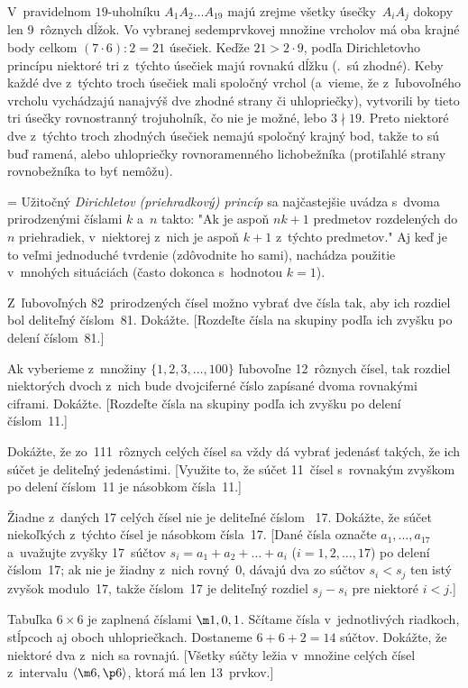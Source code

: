 {V~pravidelnom $19$-uholníku $A_1A_2\dots A_{19}$ majú zrejme
všetky úsečky~$A_iA_j$ dokopy len 9~rôznych dĺžok.
Vo vybranej sedemprvkovej množine vrcholov má oba krajné body celkom
$(7\cdot6):2=21$ úsečiek. Keďže $21>2\cdot9$, podľa
Dirichletovho princípu niektoré tri z~týchto úsečiek majú rovnakú
dĺžku (\tj.~sú zhodné).
Keby každé dve z~týchto troch úsečiek mali spoločný vrchol (a~vieme, že
z~ľubovoľného vrcholu vychádzajú nanajvýš dve zhodné strany či uhlopriečky),
vytvorili by tieto tri úsečky rovnostranný trojuholník, čo nie je možné,
lebo $3\nmid19$. Preto niektoré dve z~týchto troch zhodných úsečiek
nemajú spoločný krajný bod, takže to sú buď ramená, alebo
uhlopriečky rovnoramenného lichobežníka (protiľahlé strany
rovnobežníka to byť nemôžu).


{\everypar={}
Užitočný {\it Dirichletov (priehradkový) princíp\/} sa najčastejšie
uvádza s~dvoma prirodzenými číslami $k$ a~$n$ takto: "Ak je aspoň
$nk+1$ predmetov rozdelených do $n$ priehradiek, v~niektorej z~nich je
aspoň $k+1$ z~týchto predmetov." Aj keď je to veľmi jednoduché
tvrdenie (zdôvodnite ho sami), nachádza použitie
v~mnohých situáciách (často dokonca s~hodnotou $k=1$).}

Z~ľubovoľných 82~prirodzených čísel možno vybrať dve čísla
tak, aby ich rozdiel bol deliteľný číslom~81. Dokážte.
[Rozdeľte čísla na skupiny podľa ich zvyšku po delení číslom~81.]

Ak vyberieme z~množiny $\{1, 2, 3,\dots, 100\}$ ľubovoľne 12~rôznych
čísel, tak rozdiel niektorých dvoch z~nich bude dvojciferné číslo
zapísané dvoma rovnakými ciframi. Dokážte.
[Rozdeľte čísla na skupiny podľa ich zvyšku po delení číslom~11.]

Dokážte, že zo~111~rôznych celých čísel sa vždy dá vybrať
jedenásť takých, že ich súčet je deliteľný jedenástimi.
[Využite to, že súčet 11~čísel s~rovnakým zvyškom po delení
číslom~11 je násobkom čísla~11.]

Žiadne z~daných 17 celých čísel nie je deliteľné číslom~
17. Dokážte, že súčet niekoľkých z~týchto čísel je násobkom
čísla~17. [Dané čísla označte $a_1,\dots, a_{17}$ a~uvažujte
zvyšky 17~súčtov $s_i=a_1+a_2+\dots+a_i$ ($i=1, 2,\dots, 17$)
po delení číslom~17; ak nie je žiadny z~nich rovný~0, dávajú dva
zo súčtov $s_i<s_j$ ten istý zvyšok modulo~17, takže
číslom~17 je deliteľný rozdiel $s_j-s_i$ pre niektoré $i<j$.]

Tabuľka $6\times6$ je zaplnená číslami $\m1, 0, 1$. Sčítame čísla
v~jednotlivých riadkoch, stĺpcoch aj oboch uhlopriečkach. Dostaneme
$6+6+2=14$ súčtov. Dokážte, že niektoré dva z~nich sa rovnajú.
[Všetky súčty ležia v~množine celých čísel z~intervalu
$\langle\m6,\p6\rangle$, ktorá má len 13~prvkov.]

}
